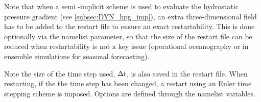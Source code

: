 \documentclass[../main/NEMO_manual]{subfiles}
\begin{document}
Note that when a semi -implicit scheme is used to evaluate the hydrostatic pressure gradient
(see \autoref{subsec:DYN_hpg_imp}), an extra three-dimensional field has to
be added to the restart file to ensure an exact restartability.
This is done optionally via the   namelist parameter,
so that the size of the restart file can be reduced when restartability is not a key issue
(operational oceanography or in ensemble simulations for seasonal forecasting).

Note the size of the time step used, $\Delta t$, is also saved in the restart file.
When restarting, if the the time step has been changed, a restart using an Euler time stepping scheme is imposed.
Options are defined through the   namelist variables.

\end{document}
